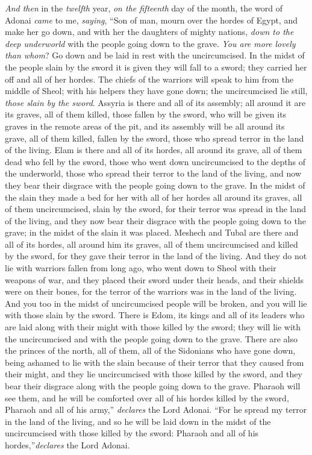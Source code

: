 \begin{biblechapter}
\verse \textit{And then} in the \textit{twelfth} year, \textit{on the fifteenth} day of the month, the word of Adonai \textit{came} to me, \textit{saying},
\verse “Son of man, mourn over the hordes of Egypt, and make her go down, and with her the daughters of mighty nations, \textit{down to the deep underworld} with the people going down to the grave.
\verse \textit{You are more lovely than whom}? Go down and be laid in rest with the uncircumcised.
\verse In the midst of the people slain by the sword it is given they will fall to a sword; they carried her off and all of her hordes.
\verse The chiefs of the warriors will speak to him from the middle of Sheol; with his helpers they have gone down; the uncircumcised lie still, \textit{those slain by the sword}.
\verse Assyria is there and all of its assembly; all around it are its graves, all of them killed, those fallen by the sword,
\verse who will be given its graves in the remote areas of the pit, and its assembly will be all around its grave, all of them killed, fallen by the sword, those who spread terror in the land of the living.
\verse Elam is there and all of its hordes, all around its grave, all of them dead who fell by the sword, those who went down uncircumcised to the depths of the underworld, those who spread their terror to the land of the living, and now they bear their disgrace with the people going down to the grave.
\verse In the midst of the slain they made a bed for her with all of her hordes all around its graves, all of them uncircumcised, slain by the sword, for their terror was spread in the land of the living, and they now bear their disgrace with the people going down to the grave; in the midst of the slain it was placed.
\verse Meshech and Tubal are there and all of its hordes, all around him its graves, all of them uncircumcised and killed by the sword, for they gave their terror in the land of the living.
\verse And they do not lie with warriors fallen from long ago, who went down to Sheol with their weapons of war, and they placed their sword under their heads, and their shields were on their bones, for the terror of the warriors was in the land of the living.
\verse And you too in the midst of uncircumcised people will be broken, and you will lie with those slain by the sword.
\verse There is Edom, its kings and all of its leaders who are laid along with their might with those killed by the sword; they will lie with the uncircumcised and with the people going down to the grave.
\verse There are also the princes of the north, all of them, all of the Sidonians who have gone down, being ashamed to lie with the slain because of their terror that they caused from their might, and they lie uncircumcised with those killed by the sword, and they bear their disgrace along with the people going down to the grave.
\verse Pharaoh will see them, and he will be comforted over all of his hordes killed by the sword, Pharaoh and all of his army,” \textit{declares} the Lord Adonai.
\verse “For he spread my terror in the land of the living, and so he will be laid down in the midst of the uncircumcised with those killed by the sword: Pharaoh and all of his hordes,”\textit{declares} the Lord Adonai.
\end{biblechapter}

